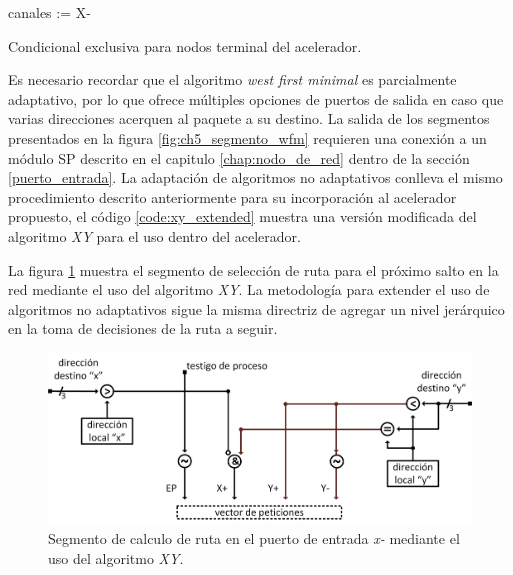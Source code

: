 \begin{algorithm}[]
		\Begin
			{
					{
						canales := X-\;
					}
			}
	\caption
		{
			Condicional exclusiva para nodos terminal del acelerador.
		}	
	\label{code:west_first_minimal_terminal}
\end{algorithm}


Es necesario recordar que el algoritmo \textit{west first minimal} es parcialmente adaptativo, por lo que ofrece múltiples opciones de puertos de salida en caso que varias direcciones acerquen al paquete a su destino. La salida de los segmentos presentados en la figura \ref{fig:ch5_segmento_wfm} requieren una conexión a un módulo SP descrito en el capitulo \ref{chap:nodo_de_red} dentro de la sección \ref{puerto_entrada}. La adaptación de algoritmos no adaptativos conlleva el mismo procedimiento descrito anteriormente para su incorporación al acelerador propuesto, el código \ref{code:xy_extended} muestra una versión modificada del algoritmo \textit{XY} para el uso dentro del acelerador.

La figura \ref{fig:ch5_segmento_xy} muestra el segmento de selección de ruta para el próximo salto en la red mediante el uso del algoritmo \textit{XY}. La metodología para extender el uso de algoritmos no adaptativos sigue la misma directriz de agregar un nivel jerárquico en la toma de decisiones de la ruta a seguir.

\begin{figure}
	\begin{center}
		\includegraphics[scale=0.75]{figures/ch5_segmento_xy.png}
	\end{center}
	\caption
		{	
			Segmento de calculo de ruta en el puerto de entrada \textit{x-} mediante el uso del algoritmo \textit{XY}.
		}
	\label{fig:ch5_segmento_xy}
\end{figure}


